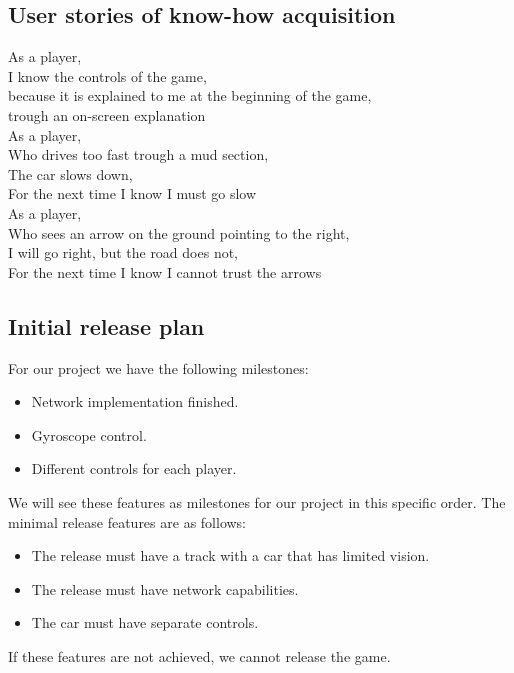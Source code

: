 \documentclass[11pt,twoside,a4paper]{article}
\begin{document}
\subsection{User stories of know-how acquisition}
As a player,\\
I know the controls of the game,\\
because it is explained to me at the beginning of the game,\\
trough an on-screen explanation\\

As a player,\\
Who drives too fast trough a mud section,\\
The car slows down,\\
For the next time I know I must go slow\\

As a player,\\
Who sees an arrow on the ground pointing to the right,\\
I will go right, but the road does not,\\
For the next time I know I cannot trust the arrows\\


\subsection{Initial release plan}
For our project we have the following milestones:

\begin{itemize}
  \item Network implementation finished.
  \item Gyroscope control.
  \item Different controls for each player.
\end{itemize}

We will see these features as milestones for our project in this specific order. The minimal release features are as follows:

\begin{itemize}
  \item The release must have a track with a car that has limited vision.
  \item The release must have network capabilities.
  \item The car must have separate controls.
\end{itemize}

If these features are not achieved, we cannot release the game.
\end{document}
